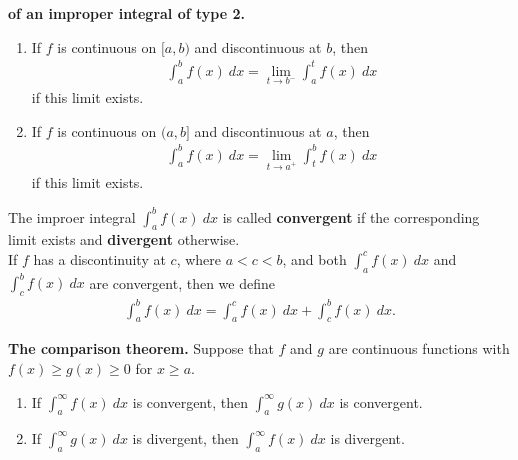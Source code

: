 \documentclass{article}
\begin{document}
\begin{definition}
    \textbf{of an improper integral of type 2.}
    \begin{enumerate}
        \item If $f$ is continuous on $[a,b)$ and discontinuous at $b$, then
              \begin{align*}
                  \int_a^b f(x)\:dx = \lim_{t\to b^-}\int_a^t f(x)\: dx
              \end{align*}
              if this limit exists.
        \item If $f$ is continuous on $(a,b]$ and discontinuous at $a$, then
              \begin{align*}
                  \int_a^b f(x)\:dx = \lim_{t\to a^+}\int_t^b f(x)\: dx
              \end{align*}
              if this limit exists.
    \end{enumerate}
    The improer integral $\int_a^b f(x)\:dx$ is called \textbf{convergent} if the corresponding limit exists and \textbf{divergent} otherwise.\\
    If $f$ has a discontinuity at $c$, where $a<c<b$, and both $\int_a^c f(x)\:dx$ and $\int_c^b f(x)\:dx$ are convergent, then we define
    \begin{align*}
        \int_a^b f(x)\: dx = \int_a^c f(x)\:dx + \int_c^b f(x)\:dx.
    \end{align*}
\end{definition}
\begin{theorem}
    \textbf{The comparison theorem.} Suppose that $f$ and $g$ are continuous functions with $f(x)\geq g(x)\geq 0$ for $x\geq a$.
    \begin{enumerate}
        \item If $\int_a^\infty f(x)\:dx$ is convergent, then $\int_a^\infty g(x)\:dx$ is convergent.
        \item If $\int_a^\infty g(x)\:dx$ is divergent, then $\int_a^\infty f(x)\:dx$ is divergent.
    \end{enumerate}
\end{theorem}
\end{document}
